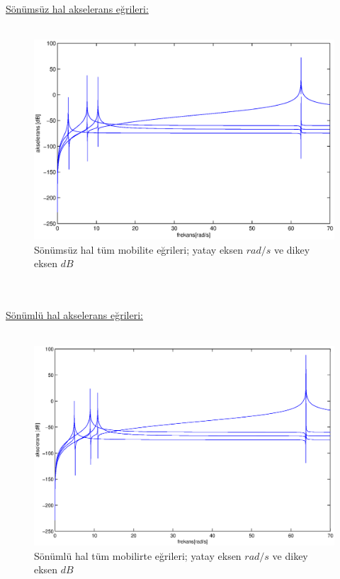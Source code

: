 \documentclass[a4paper]{report}
\begin{document}
~\\\clearpage~\\
\underline{Sönümsüz hal akselerans eğrileri:}\\
~\\
\begin{figure}[H]\shorthandoff{=}
\centerline{
{\includegraphics[width=1.3\textwidth]{./akselerans.eps}}}
\caption[Sönümsüz hal nokta FRF'ler]{Sönümsüz hal tüm mobilite eğrileri; yatay eksen ${rad}/{s}$ ve dikey eksen $dB$ }
\label{fig:noktaFRFs4-7}
\end{figure}
~\\\clearpage~\\
\underline{Sönümlü hal akselerans eğrileri:}\\
~\\
\begin{figure}[H]\shorthandoff{=}
\centerline{
{\includegraphics[width=1.3\textwidth]{./akseleranss.eps}}}
\caption[Sönümsüz hal nokta FRF'ler]{Sönümlü hal tüm mobilirte eğrileri; yatay eksen ${rad}/{s}$ ve dikey eksen $dB$ }
\label{fig:noktaFRFs4-7}
\end{figure}
\end{document}
